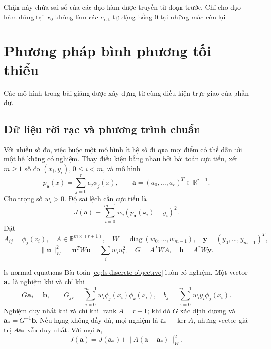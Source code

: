 \documentclass[12pt,a4paper,oneside]{book}
\numberwithin{algorithm}{chapter}
\theoremstyle{definition}
\newcommand{\R}{\mathbb{R}}
\begin{document}
Chặn này chứa sai số của các đạo hàm được truyền từ đoạn trước. Chỉ cho đạo hàm đúng tại $x_0$ không làm các $e_{i,k}$ tự động bằng $0$ tại những mốc còn lại.

\section{Phương pháp bình phương tối thiểu}
Các mô hình trong bài giảng \cite{ls-slides} được xây dựng từ cùng điều kiện trực giao của phần dư.
\subsection{Dữ liệu rời rạc và phương trình chuẩn}
Với nhiều số đo, việc buộc một mô hình ít hệ số đi qua mọi điểm có thể dẫn tới một hệ không có nghiệm. Thay điều kiện bằng nhau bởi bài toán cực tiểu, xét $m\geq1$ số đo $(x_i,y_i)$, $0\leq i<m$, và mô hình
\[
 p_{\mathbf a}(x)=\sum_{j=0}^{r}a_j\phi_j(x),\qquad
 \mathbf a=(a_0,\ldots,a_r)^T\in\R^{r+1}.
\]
Cho trọng số $w_i>0$. Độ sai lệch cần cực tiểu là
\begin{equation}\label{eq:ls-discrete-objective}
 J(\mathbf a)=\sum_{i=0}^{m-1}w_i\left(p_{\mathbf a}(x_i)-y_i\right)^2.
\end{equation}
Đặt
\[
 A_{ij}=\phi_j(x_i),\quad A\in\R^{m\times(r+1)},\quad
 W=\operatorname{diag}(w_0,\ldots,w_{m-1}),\quad \mathbf y=(y_0,\ldots,y_{m-1})^T,
\]
\[
 \|\mathbf u\|_W^2=\mathbf u^TW\mathbf u=\sum_iw_iu_i^2,\quad
 G=A^TWA,\quad\mathbf b=A^TW\mathbf y.
\]
\begin{dinhly}{}{ls-normal-equations}
Bài toán \eqref{eq:ls-discrete-objective} luôn có nghiệm. Một vector $\mathbf a_*$ là nghiệm khi và chỉ khi
\begin{equation}\label{eq:ls-normal-equations}
 G\mathbf a_*=\mathbf b,\qquad
 G_{jk}=\sum_{i=0}^{m-1}w_i\phi_j(x_i)\phi_k(x_i),\quad
 b_j=\sum_{i=0}^{m-1}w_iy_i\phi_j(x_i).
\end{equation}
Nghiệm duy nhất khi và chỉ khi $\operatorname{rank}A=r+1$; khi đó $G$ xác định dương và $\mathbf a_*=G^{-1}\mathbf b$. Nếu hạng không đầy đủ, mọi nghiệm là $\mathbf a_*+\ker A$, nhưng vector giá trị $A\mathbf a_*$ vẫn duy nhất. Với mọi $\mathbf a$,
\begin{equation}\label{eq:ls-discrete-pythagoras}
 J(\mathbf a)=J(\mathbf a_*)+\|A(\mathbf a-\mathbf a_*)\|_W^2.
\end{equation}
\end{dinhly}
\end{document}
